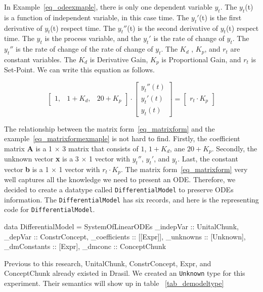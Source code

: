 In Example~\ref{eq_odeexmaple}, there is only one dependent variable $y_t$. The $y_t$(t) is a function of independent variable, in this case time. The $y_t'$(t) is the first derivative of $y_t$(t) respect time. The $y_t''$(t) is the second derivative of $y_t$(t) respect time. The $y_t$ is the process variable, and the $y_t'$ is the rate of change of $y_t$. The $y_t''$ is the rate of change of the rate of change of $y_t$. The $K_d$ , $K_p$, and $r_t$ are constant variables. The $K_d$ is Derivative Gain, $K_p$ is Proportional Gain, and $r_t$ is Set-Point. We can write this equation as follows.

\begin{equation} \label{eq_matrixformexmaple}
	\begin{bmatrix}
		1, & 1 + K_{d}, & 20 + K_{p}
	\end{bmatrix}
	\cdot
	\begin{bmatrix}
		y_{t}''(t)  \\
		y_{t}'(t)   \\
		y_{t}(t)  
	\end{bmatrix}
	=
	\begin{bmatrix}
		r_{t} \cdot K_{p} 
	\end{bmatrix}
\end{equation}

The relationship between the matrix form~\ref{eq_matrixform} and the example~\ref{eq_matrixformexmaple} is not hard to find. Firstly, the coefficient matrix \textbf{A} is a 1 $\times$ 3 matrix that consists of $1$, $1 + K_d$, ane $20 + K_p$. Secondly, the unknown vector \textbf{x} is a 3 $\times$ 1 vector with $y_t''$, $y_t'$, and $y_t$. Last, the constant vector \textbf{b} is a 1 $\times$ 1 vector with $r_t \cdot K_p$. The matrix form~\ref{eq_matrixform} very well captures all the knowledge we need to present an ODE. Therefore, we decided to create a datatype called \verb|DifferentialModel| to preserve ODEs information. The \verb|DifferentialModel| has six records, and here is the representing code for \verb|DifferentialModel|.
\begin{haskell1}
data DifferentialModel = SystemOfLinearODEs {
	_indepVar :: UnitalChunk,
	_depVar :: ConstrConcept,
	_coefficients :: [[Expr]],
	_unknowns :: [Unknown],
	_dmConstants :: [Expr],
	_dmconc :: ConceptChunk
}
\end{haskell1}

Previous to this research, UnitalChunk, ConstrConcept, Expr, and ConceptChunk already existed in Drasil. We created an \verb|Unknown| type for this experiment. Their semantics will show up in table ~\ref{tab_demodeltype}

